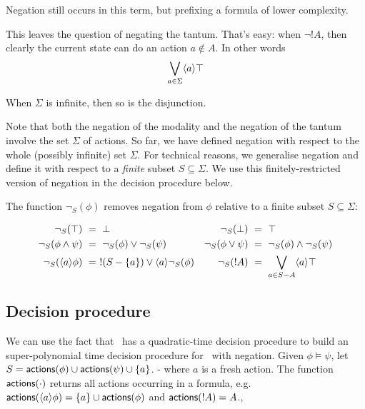 \NI Negation still occurs in this term, but prefixing a formula of
lower complexity.

This leaves the question of negating the tantum. That's easy: when
$\neg !A$, then clearly the current state can do an action $a \notin
A$. In other words
\[
   \bigvee_{a \in \Sigma}\langle a \rangle \top
\]

\NI When $\Sigma$ is infinite, then so is the disjunction.

Note that both the negation of the modality and the negation of
the tantum involve the set $\Sigma$ of actions. 
So far, we have defined negation with respect to
the whole (possibly infinite) set $\Sigma$. For technical reasons, we
generalise negation and define it with respect to a \emph{finite}
subset $S \subseteq \Sigma$. We use this finitely-restricted version of
negation in the decision procedure below.

\begin{definition}
The function $\neg_{S}(\phi)$ removes negation from $\phi$
relative to a finite subset $S \subseteq \Sigma$:

\begin{align*}
  \neg_{S}(\top) &\ =\  \bot  &
  \neg_S(\bot) &\ =\  \top  \\
  \neg_S(\phi \land \psi) &\ =\  \neg_S(\phi) \lor \neg_S(\psi)  &
  \neg_S(\phi \lor \psi) &\ =\  \neg_S(\phi) \land \neg_S(\psi)  \\
  \neg_S(\langle a \rangle \phi) &\ =\  !(S-\{a\}) \lor \langle a \rangle \neg_S(\phi)  &
  \neg_S(! A) &\ =\  \bigvee_{a \in S - A} \langle a \rangle \top
\end{align*}


\end{definition}

\subsection{Decision procedure}

\NI We can use the fact that \cathoristic\ has a quadratic-time
decision procedure to build an super-polynomial time decision procedure for
\cathoristic\ with negation.  Given $\phi \models \psi$, let $S =
\mathsf{actions}(\phi) \cup \mathsf{actions}(\psi) \cup \{a\}$.  - where $a$ is a
fresh action.  The function $\mathsf{actions}(\cdot)$ returns all actions
occurring in a formula, e.g. $\mathsf{actions}(\langle a \rangle \phi) = \{a\} \cup
\mathsf{actions}(\phi)$ and $\mathsf{actions}(!A) = A$.,

